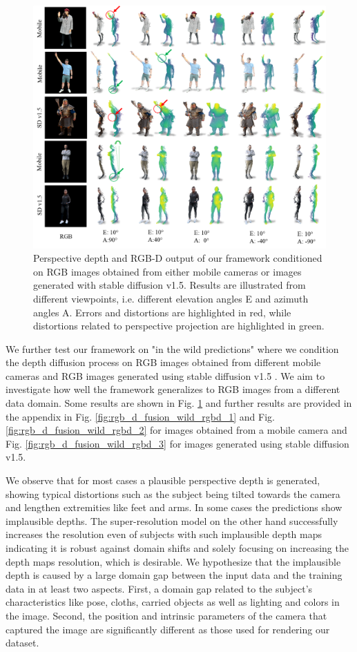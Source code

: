 \begin{figure}[t]
  \centering
  \includegraphics[width=0.99\linewidth]{illustrations/in_the_wild.png}
  \caption{Perspective depth and RGB-D output of our \modelname{} framework conditioned on RGB images obtained from either mobile cameras or images generated with stable diffusion v1.5. Results are illustrated from different viewpoints, i.e. different elevation angles E and azimuth angles A. Errors and distortions are highlighted in red, while distortions related to perspective projection are highlighted in green.}
  \label{fig:in_the_wild}
\end{figure}

We further test our \modelname{} framework on "in the wild predictions" where we condition the depth diffusion process on RGB images obtained from different mobile cameras and RGB images generated using stable diffusion v1.5 \citep{rombach_high-resolution_2022}. We aim to investigate how well the framework generalizes to RGB images from a different data domain. Some results are shown in Fig. \ref{fig:in_the_wild} and further results are provided in the appendix in Fig. \ref{fig:rgb_d_fusion_wild_rgbd_1} and Fig. \ref{fig:rgb_d_fusion_wild_rgbd_2} for images obtained from a mobile camera and Fig. \ref{fig:rgb_d_fusion_wild_rgbd_3} for images generated using stable diffusion v1.5.

We observe that for most cases a plausible perspective depth is generated, showing typical distortions such as the subject being tilted towards the camera and lengthen extremities like feet and arms. In some cases the predictions show implausible depths. The super-resolution model on the other hand successfully increases the resolution even of subjects with such implausible depth maps indicating it is robust against domain shifts and solely focusing on increasing the depth maps resolution, which is desirable.
We hypothesize that the implausible depth is caused by a large domain gap between the input data and the training data in at least two aspects. First, a domain gap related to the subject's characteristics like pose, cloths, carried objects as well as lighting and colors in the image. Second, the position and intrinsic parameters of the camera that captured the image are significantly different as those used for rendering our dataset.